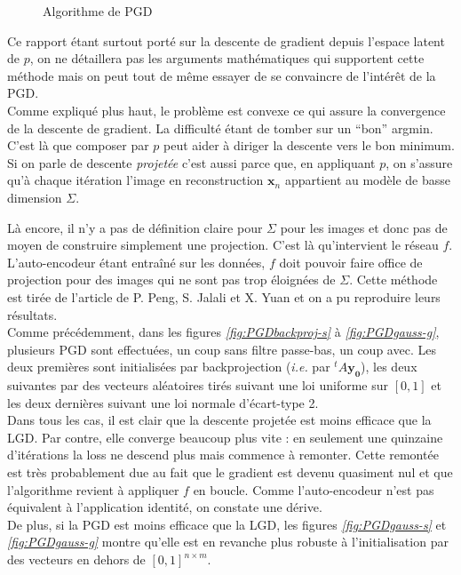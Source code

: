 \documentclass[hidelinks, french]{article} %
\newcommand{\ie}{\textit{i.e. }}
\renewcommand{\bf}[1]{\boldsymbol{#1}}
\theoremstyle{enonce}
\theoremstyle{special}
\theoremstyle{rq}
\theoremstyle{exo}
\theoremstyle{demo}
\begin{document}
\begin{wrapfigure}{r}{0.44\textwidth}
	
	\caption{Algorithme de PGD}
	\label{fig:pcode PGD}
\end{wrapfigure}
\noindent Ce rapport étant surtout porté sur la descente de gradient depuis l'espace latent de $p$, on ne détaillera pas les arguments mathématiques qui supportent cette méthode mais on peut tout de même essayer de se convaincre de l'intérêt de la PGD.\\
Comme expliqué plus haut, le problème est convexe ce qui assure la convergence de la descente de gradient. La difficulté étant de tomber sur un ``bon'' argmin. C'est là que composer par $p$ peut aider à diriger la descente vers le bon minimum. Si on parle de descente \emph{projetée} c'est aussi parce que, en appliquant $p$, on s'assure qu'à chaque itération l'image en reconstruction $\bf{x}_n$ appartient au modèle de basse dimension $\Sigma$.

Là encore, il n’y a pas de définition claire pour $\Sigma$ pour les images et donc pas de moyen de construire simplement une projection. C’est là qu’intervient le réseau $f$.
L'auto-encodeur étant entraîné sur les données, $f$ doit pouvoir faire office de projection pour des images qui ne sont pas trop éloignées de $\Sigma$. Cette méthode est tirée de l'article \cite{peng_solving_2019} de P. Peng, S. Jalali et X. Yuan et on a pu reproduire leurs résultats. 
\\

Comme précédemment, dans les figures \textit{\ref{fig:PGDbackproj-s}} à \textit{\ref{fig:PGDgauss-g}}, plusieurs PGD sont effectuées, un coup sans filtre passe-bas, un coup avec. Les deux premières sont initialisées par backprojection (\ie par $^tA\bf{y_0}$), les deux suivantes par des vecteurs aléatoires tirés suivant une loi uniforme sur $[0,1]$ et les deux dernières suivant une loi normale d'écart-type 2.
\\
Dans tous les cas, il est clair que la descente projetée est moins efficace que la LGD. Par contre, elle converge beaucoup plus vite : en seulement une quinzaine d’itérations la loss ne descend plus mais commence à remonter. Cette remontée est très probablement due au fait que le gradient est devenu quasiment nul et que l’algorithme revient à appliquer $f$ en boucle. Comme l'auto-encodeur n’est pas équivalent à l’application identité, on constate une dérive.
\\
De plus, si la PGD est moins efficace que la LGD, les figures \textit{\ref{fig:PGDgauss-s}} et \textit{\ref{fig:PGDgauss-g}} montre qu’elle est en revanche plus robuste à l’initialisation par des vecteurs en dehors de $[0,1]^{n\times m}$.
\\
\end{document}
